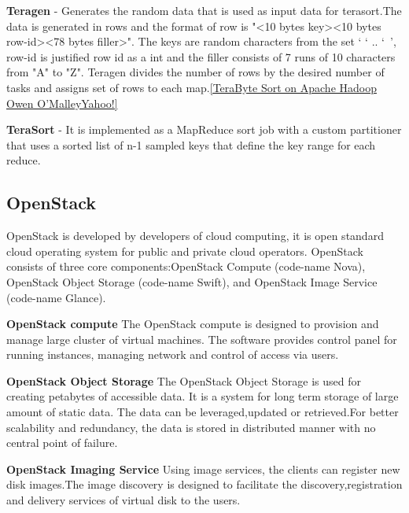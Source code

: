 \textbf{Teragen} - Generates the random data that is used as input data for terasort.The data is generated in rows and the format of 
row is "<10 bytes key><10 bytes row-id><78 bytes filler>". 
The keys are random characters from the set ‘ ‘ .. ‘~’, row-id is justified row id as a int and the filler consists of 7 runs of 10 characters from "A" to "Z". Teragen divides the number of rows by the desired number of tasks and assigns set of rows to each map.\ref{TeraByte Sort on Apache Hadoop Owen O’MalleyYahoo!}


\textbf{TeraSort} - It is implemented as a MapReduce sort job with a custom partitioner that uses a sorted list of n-1 sampled keys that define the key range for each reduce.







\subsection{OpenStack}

OpenStack is developed by developers of cloud computing, it is open standard cloud operating system for public and private cloud operators. OpenStack consists of three core components:OpenStack Compute (code-name Nova), OpenStack Object Storage (code-name Swift), and OpenStack Image Service (code-name Glance).


\textbf{OpenStack compute} The OpenStack compute is designed to provision and manage large cluster of virtual machines. The software provides control panel for running instances, managing network and control of access via users.
 
\textbf{OpenStack Object Storage} The OpenStack Object Storage is used for creating petabytes of accessible data. It is a system for long term storage of large amount of static data. The data can be leveraged,updated or retrieved.For better scalability and redundancy, the data is stored in distributed manner with no central point of failure.

\textbf{OpenStack Imaging Service} Using image services, the clients can register new disk images.The image discovery is designed to facilitate the discovery,registration and delivery services of virtual disk to the users.               
              
